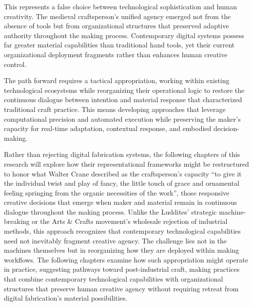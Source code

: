 This represents a false choice between technological sophistication and human creativity. The medieval craftsperson's unified agency emerged not from the absence of tools but from organizational structures that preserved adaptive authority throughout the making process. Contemporary digital systems possess far greater material capabilities than traditional hand tools, yet their current organizational deployment fragments rather than enhances human creative control.

\vspace{0.5cm}

The path forward requires a tactical appropriation, working within existing technological ecosystems while reorganizing their operational logic to restore the continuous dialogue between intention and material response that characterized traditional craft practice. This means developing approaches that leverage computational precision and automated execution while preserving the maker's capacity for real-time adaptation, contextual response, and embodied decision-making.

\vspace{0.5cm}

Rather than rejecting digital fabrication systems, the following chapters of this research will explore how their representational frameworks might be restructured to honor what Walter Crane described as the craftsperson's capacity ``to give it the individual twist and play of fancy, the little touch of grace and ornamental feeling springing from the organic necessities of the work'', those responsive creative decisions that emerge when maker and material remain in continuous dialogue throughout the making process. Unlike the Luddites' strategic machine-breaking or the Arts \& Crafts movement's wholesale rejection of industrial methods, this approach recognizes that contemporary technological capabilities need not inevitably fragment creative agency. The challenge lies not in the machines themselves but in reorganizing how they are deployed within making workflows. The following chapters examine how such appropriation might operate in practice, suggesting pathways toward post-industrial craft, making practices that combine contemporary technological capabilities with organizational structures that preserve human creative agency without requiring retreat from digital fabrication's material possibilities.